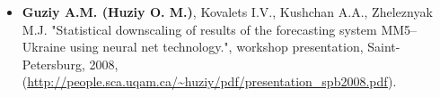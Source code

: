 \begin{itemize}
    \item \textbf{Guziy A.M. (Huziy O. M.)}, Kovalets I.V., Kushchan A.A.,
    Zheleznyak M.J.
    "Statistical downscaling of results of the forecasting system MM5–Ukraine using neural net technology.",
    workshop presentation, Saint-Petersburg, 2008, (\url{http://people.sca.uqam.ca/~huziy/pdf/presentation_spb2008.pdf}).

\end{itemize}
